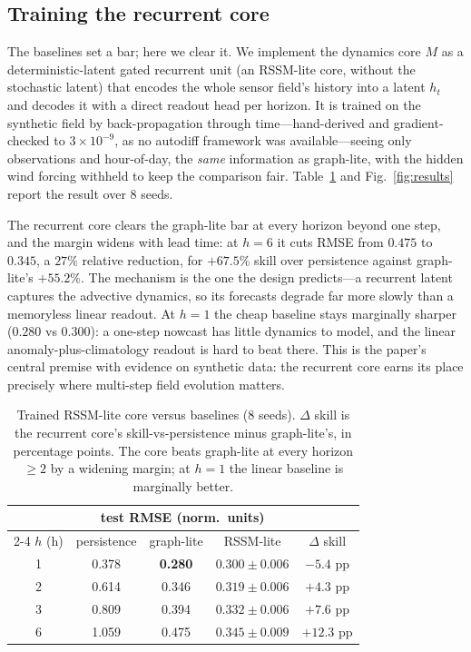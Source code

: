 \documentclass[10pt]{article}
\begin{document}
\subsection{Training the recurrent core}
\label{sec:rssm}
The baselines set a bar; here we clear it. We implement the dynamics core $M$ as a
deterministic-latent gated recurrent unit (an RSSM-lite core, without the stochastic
latent) that encodes the whole sensor field's history into a latent $h_t$ and
decodes it with a direct readout head per horizon. It is trained on the synthetic
field by back-propagation through time---hand-derived and gradient-checked to
$3\times10^{-9}$, as no autodiff framework was available---seeing only observations
and hour-of-day, the \emph{same} information as graph-lite, with the hidden wind
forcing withheld to keep the comparison fair. Table~\ref{tab:rssm} and
Fig.~\ref{fig:results} report the result over 8 seeds.

The recurrent core clears the graph-lite bar at every horizon beyond one step, and
the margin widens with lead time: at $h=6$ it cuts RMSE from $0.475$ to $0.345$, a
$27\%$ relative reduction, for $+67.5\%$ skill over persistence against graph-lite's
$+55.2\%$. The mechanism is the one the design predicts---a recurrent latent
captures the advective dynamics, so its forecasts degrade far more slowly than a
memoryless linear readout. At $h=1$ the cheap baseline stays marginally sharper
($0.280$ vs $0.300$): a one-step nowcast has little dynamics to model, and the
linear anomaly-plus-climatology readout is hard to beat there. This is the paper's
central premise with evidence on synthetic data: the recurrent core earns its place
precisely where multi-step field evolution matters.

\begin{table}[t]
\centering
\small
\begin{tabular}{@{}c ccc c@{}}
\toprule
& \multicolumn{3}{c}{\textbf{test RMSE} (norm.\ units)} & \\
\cmidrule(lr){2-4}
$h$ (h) & persistence & graph-lite & RSSM-lite & $\Delta$ skill \\
\midrule
1 & 0.378 & \textbf{0.280} & $0.300\pm0.006$ & $-5.4$ pp \\
2 & 0.614 & 0.346 & $\mathbf{0.319\pm0.006}$ & $+4.3$ pp \\
3 & 0.809 & 0.394 & $\mathbf{0.332\pm0.006}$ & $+7.6$ pp \\
6 & 1.059 & 0.475 & $\mathbf{0.345\pm0.009}$ & $+12.3$ pp \\
\bottomrule
\end{tabular}
\caption{Trained RSSM-lite core versus baselines (8 seeds). $\Delta$ skill is the
recurrent core's skill-vs-persistence minus graph-lite's, in percentage points. The
core beats graph-lite at every horizon $\geq2$ by a widening margin; at $h=1$ the
linear baseline is marginally better.}
\label{tab:rssm}
\end{table}
\end{document}
